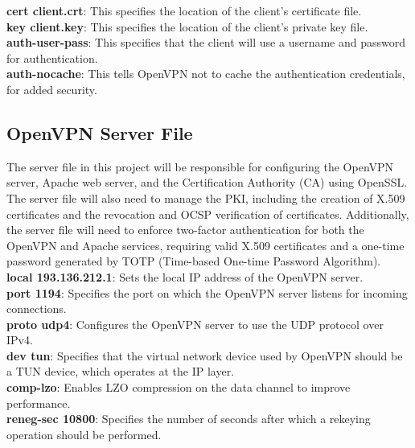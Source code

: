 \documentclass[12pt]{article}
\begin{document}
\textbf{cert client.crt}: This specifies the location of the client's certificate file.\\

\textbf{key client.key}: This specifies the location of the client's private key file.\\

\textbf{auth-user-pass}: This specifies that the client will use a username and password for authentication.\\

\textbf{auth-nocache}: This tells OpenVPN not to cache the authentication credentials, for added security.\\

\subsection{OpenVPN Server File}

The server file in this project will be responsible for configuring the OpenVPN server, Apache web server, and the Certification Authority (CA) using OpenSSL. The server file will also need to manage the PKI, including the creation of X.509 certificates and the revocation and OCSP verification of certificates. Additionally, the server file will need to enforce two-factor authentication for both the OpenVPN and Apache services, requiring valid X.509 certificates and a one-time password generated by TOTP (Time-based One-time Password Algorithm).\\


\textbf{local 193.136.212.1}: Sets the local IP address of the OpenVPN server.\\

\textbf{port 1194}: Specifies the port on which the OpenVPN server listens for incoming connections.\\

\textbf{proto udp4}: Configures the OpenVPN server to use the UDP protocol over IPv4.\\

\textbf{dev tun}: Specifies that the virtual network device used by OpenVPN should be a TUN device, which operates at the IP layer.\\

\textbf{comp-lzo}: Enables LZO compression on the data channel to improve performance.\\

\textbf{reneg-sec 10800}: Specifies the number of seconds after which a rekeying operation should be performed.\\
\end{document}
